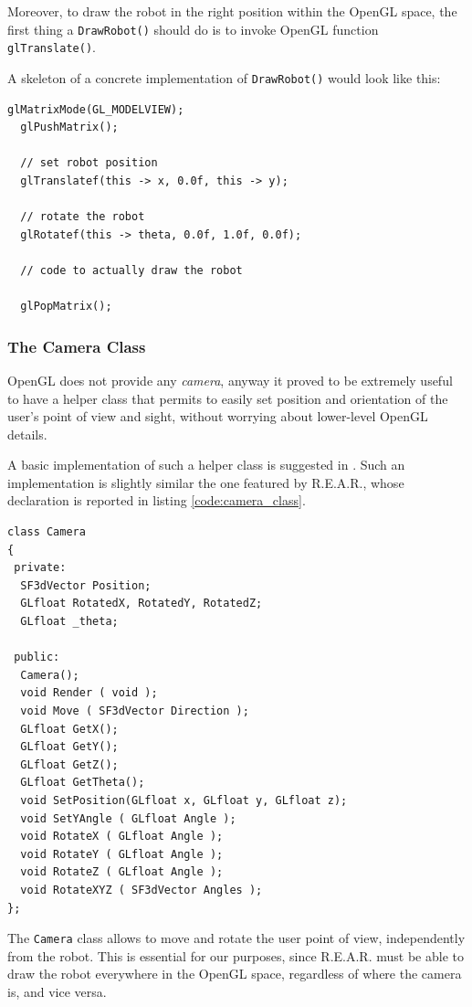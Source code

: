 %
Moreover, to draw the robot in the right position within 
the OpenGL space, the first thing a \texttt{DrawRobot()} should 
do is to invoke OpenGL function \texttt{glTranslate()}.
%

%
A skeleton of a concrete implementation of \texttt{DrawRobot()}
would look like this:
\begin{lstlisting}[caption={\texttt{DrawRobot()} skeleton}, label={code:drawrobot_skeleton}, frame=trBL]  
  glMatrixMode(GL_MODELVIEW);
  glPushMatrix();

  // set robot position
  glTranslatef(this -> x, 0.0f, this -> y);

  // rotate the robot 
  glRotatef(this -> theta, 0.0f, 1.0f, 0.0f);

  // code to actually draw the robot

  glPopMatrix();
\end{lstlisting}
%

%
\subsubsection{The Camera Class}
\label{sub:cameraclass}

OpenGL does not provide any \textit{camera}, anyway it proved 
to be extremely useful to have a helper class that permits 
to easily set position and orientation of the user's 
point of view and sight, without worrying about lower-level 
OpenGL details.
%

%
A basic implementation of such a helper class is suggested 
in \cite{opengl:camera}. Such an implementation is slightly 
similar the one featured by \textsf{R.E.A.R.}, whose 
declaration is reported in listing \ref{code:camera_class}.
%
\begin{lstlisting}[caption={\texttt{Camera} class declaration}, label={code:camera_class}, frame=trBL]
class Camera
{
 private:
  SF3dVector Position;
  GLfloat RotatedX, RotatedY, RotatedZ;	
  GLfloat _theta;

 public:
  Camera();
  void Render ( void );
  void Move ( SF3dVector Direction );
  GLfloat GetX();
  GLfloat GetY();
  GLfloat GetZ();
  GLfloat GetTheta();
  void SetPosition(GLfloat x, GLfloat y, GLfloat z);
  void SetYAngle ( GLfloat Angle );
  void RotateX ( GLfloat Angle );
  void RotateY ( GLfloat Angle );
  void RotateZ ( GLfloat Angle );
  void RotateXYZ ( SF3dVector Angles );
};
\end{lstlisting}
%
The \texttt{Camera} class allows to move and rotate the user 
point of view, independently from the robot.
%
This is essential for our purposes, since \textsf{R.E.A.R.}
must be able to draw the robot everywhere in the OpenGL space, 
regardless of where the camera is, and vice versa.
%

